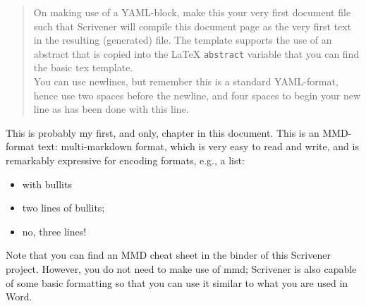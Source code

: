\documentclass[a4paper,11pt,article,oneside,oldfontcommands]{memoir}
\subtitle{This is an example Scrivener starter project}
\date{\today}
\numberwithin{equation}{section}
\begin{document}


\begin{abstract}
On making use of a YAML-block, make this your very first document file
such that Scrivener will compile this document page as the very first
text in the resulting (generated) file. The template supports the use of
an abstract that is copied into the LaTeX \texttt{abstract} variable
that you can find the basic tex template.\\
You can use newlines, but remember this is a standard YAML-format, hence
use two spaces before the newline, and four spaces to begin your new
line as has been done with this line.
\end{abstract}
%




%


\pagebreak


This is probably my first, and only, chapter in this document. This is
an MMD-format text: multi-markdown format, which is very easy to read
and write, and is remarkably expressive for encoding formats, e.g., a
list:

\begin{itemize}
\tightlist
\item
  with bullits
\item
  two lines of bullits;
\item
  no, three lines!
\end{itemize}

Note that you can find an MMD cheat sheet in the binder of this
Scrivener project. However, you do not need to make use of mmd;
Scrivener is also capable of some basic formatting so that you can use
it similar to what you are used in Word.




%
%	




\end{document}
